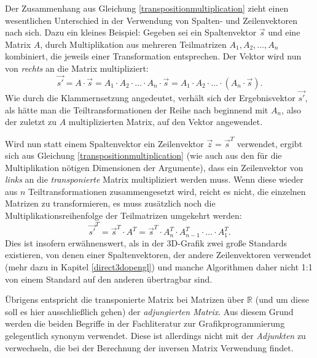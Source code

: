 Der Zusammenhang aus Gleichung \ref{transpositionmultiplication} zieht einen wesentlichen Unterschied in der Verwendung von Spalten- und Zeilenvektoren nach sich. Dazu ein kleines Beispiel: Gegeben sei ein Spaltenvektor $\vec s$ und eine Matrix $A$, durch Multiplikation aus mehreren Teilmatrizen $A_1, A_2, \dots, A_n$ kombiniert, die jeweils einer Transformation entsprechen. Der Vektor wird nun von \emph{rechts} an die Matrix multipliziert:
\begin{equation}
 \vec{s'} = A \cdot \vec{s} = A_1 \cdot A_2 \cdot \ldots \cdot A_n \cdot \vec{s} = A_1 \cdot A_2 \cdot \ldots \cdot \left( A_n \cdot \vec{s} \right).
\end{equation}
Wie durch die Klammernsetzung angedeutet, verhält sich der Ergebnisvektor $\vec{s'}$, als hätte man die Teiltransformationen der Reihe nach beginnend mit $A_n$, also der zuletzt zu $A$ multiplizierten Matrix, auf den Vektor angewendet.

Wird nun statt einem Spaltenvektor ein Zeilenvektor $\vec z = \vec{s}^T$ verwendet, ergibt sich aus Gleichung \ref{transpositionmultiplication} (wie auch aus den für die Multiplikation nötigen Dimensionen der Argumente), dass ein Zeilenvektor von \emph{links} an die \emph{transponierte} Matrix multipliziert werden muss. Wenn diese wieder aus $n$ Teiltransformationen zusammengesetzt wird, reicht es nicht, die einzelnen Matrizen zu transformieren, es muss zusätzlich noch die Multiplikationsreihenfolge der Teilmatrizen umgekehrt werden:
\begin{equation}
 \vec{s'}^T = \vec{s}^T \cdot A^T = \vec{s}^T \cdot A_n^T \cdot A_{n-1}^T \cdot \ldots \cdot A_1^T.
\end{equation}
Dies ist insofern erwähnenswert, als in der 3D-Grafik zwei große Standards existieren, von denen einer Spaltenvektoren, der andere Zeilenvektoren verwendet (mehr dazu in Kapitel  	\ref{direct3dopengl}) und manche Algorithmen daher nicht 1:1 von einem Standard auf den anderen übertragbar sind.

Übrigens entspricht die transponierte Matrix bei Matrizen über $\mathbb R$ (und um diese soll es hier ausschließlich gehen) der \emph{adjungierten Matrix}. Aus diesem Grund werden die beiden Begriffe in der Fachliteratur zur Grafikprogrammierung gelegentlich synonym verwendet. Diese ist allerdings nicht mit der \emph{Adjunkten} zu verwechseln, die bei der Berechnung der inversen Matrix Verwendung findet.

